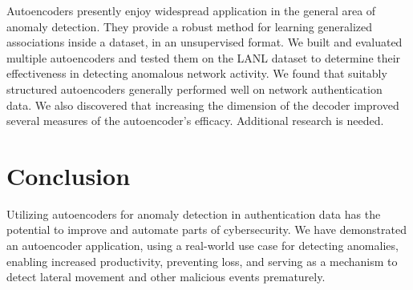 \documentclass[sigconf]{acmart}
\begin{document}
Autoencoders presently enjoy widespread application in the general area of anomaly detection.  They provide a robust method for learning generalized associations inside a dataset, in an unsupervised format\cite{AN,SAKURADA}.  We built and evaluated multiple autoencoders and tested them on the LANL dataset
to determine their effectiveness in detecting anomalous network activity.  We found that suitably structured autoencoders generally performed well on network authentication data.  We also discovered that increasing the dimension of the decoder improved several measures of the autoencoder's efficacy.  Additional research is needed.





\section{Conclusion}
Utilizing autoencoders for anomaly detection in authentication data has the potential to improve and automate parts of cybersecurity. We have demonstrated an autoencoder application, using a real-world use case for detecting anomalies, enabling increased productivity, preventing loss, and serving as a mechanism to detect lateral movement and other malicious events prematurely. 
\end{document}
